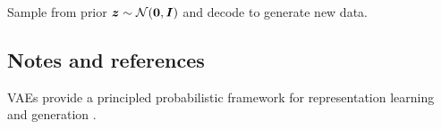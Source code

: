 Sample from prior $\boldsymbol{z} \sim \mathcal{N}(\boldsymbol{0}, \boldsymbol{I})$ and decode to generate new data.



\subsection{Notes and references}

VAEs provide a principled probabilistic framework for representation learning and generation \textcite{Kingma2013,GoodfellowEtAl2016,Prince2023}.
